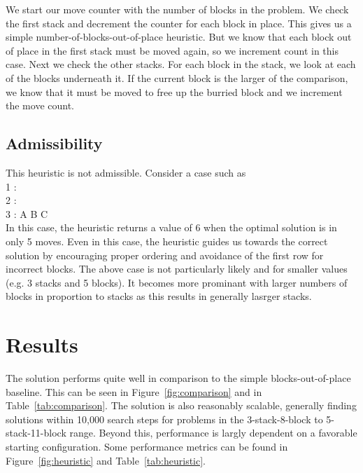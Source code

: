 \documentclass{article}
\begin{document}
We start our move counter with the number of blocks in the problem. We check the
first stack and decrement the counter for each block in place. This gives us a
simple number-of-blocks-out-of-place heuristic. But we know that each block out
of place in the first stack must be moved again, so we increment count in this
case. Next we check the other stacks. For each block in the stack, we look at
each of the blocks underneath it. If the current block is the larger of the
comparison, we know that it must be moved to free up the burried block and we
increment the move count.

\subsection{Admissibility}

This heuristic is not admissible. Consider a case such as\\
\textsc{1 :}\\
\textsc{2 :}\\
\textsc{3 : A B C}\\
In this case, the heuristic returns a value of 6 when the optimal solution is
in only 5 moves. Even in this case, the heuristic guides us towards the correct
solution by encouraging proper ordering and avoidance of the first row for
incorrect blocks. The above case is not particularly likely and for smaller
values (e.g. 3 stacks and 5 blocks). It becomes more prominant with larger
numbers of blocks in proportion to stacks as this results in generally lasrger
stacks.


\section{Results}

The solution performs quite well in comparison to the simple
blocks-out-of-place baseline. This can be seen in Figure~\ref{fig:comparison}
and in Table~\ref{tab:comparison}. The solution is also reasonably scalable,
generally finding solutions within 10,000 search steps for problems in the
3-stack-8-block to 5-stack-11-block range. Beyond this, performance is largly
dependent on a favorable starting configuration. Some performance metrics can be
found in Figure~\ref{fig:heuristic} and Table~\ref{tab:heuristic}.
\end{document}
